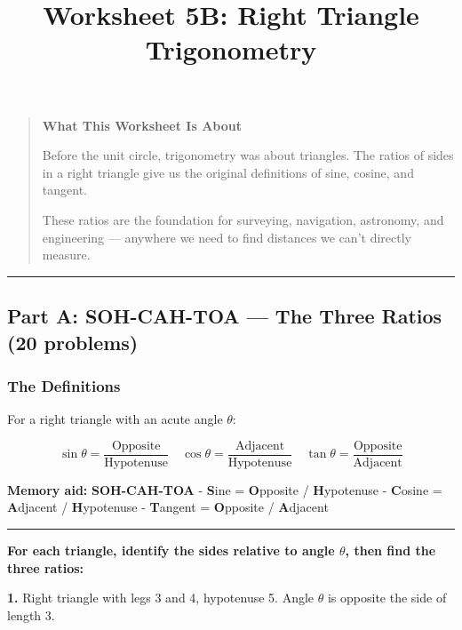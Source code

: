 \documentclass[
  11pt,
]{article}
\title{Worksheet 5B: Right Triangle Trigonometry}
\author{}
\date{}
\begin{document}
\maketitle

\begin{quote}
\textbf{What This Worksheet Is About}

Before the unit circle, trigonometry was about triangles. The ratios of
sides in a right triangle give us the original definitions of sine,
cosine, and tangent.

These ratios are the foundation for surveying, navigation, astronomy,
and engineering --- anywhere we need to find distances we can't directly
measure.
\end{quote}

\begin{center}\rule{0.5\linewidth}{0.5pt}\end{center}

\hypertarget{part-a-soh-cah-toa-the-three-ratios-20-problems}{%
\subsection{Part A: SOH-CAH-TOA --- The Three Ratios (20
problems)}\label{part-a-soh-cah-toa-the-three-ratios-20-problems}}

\hypertarget{the-definitions}{%
\subsubsection{The Definitions}\label{the-definitions}}

For a right triangle with an acute angle \(\theta\):

\[\sin\theta = \frac{\text{Opposite}}{\text{Hypotenuse}} \quad \cos\theta = \frac{\text{Adjacent}}{\text{Hypotenuse}} \quad \tan\theta = \frac{\text{Opposite}}{\text{Adjacent}}\]

\textbf{Memory aid:} \textbf{SOH-CAH-TOA} - \textbf{S}ine =
\textbf{O}pposite / \textbf{H}ypotenuse - \textbf{C}osine =
\textbf{A}djacent / \textbf{H}ypotenuse - \textbf{T}angent =
\textbf{O}pposite / \textbf{A}djacent

\begin{center}\rule{0.5\linewidth}{0.5pt}\end{center}

\textbf{For each triangle, identify the sides relative to angle
\(\theta\), then find the three ratios:}

\textbf{1.} Right triangle with legs 3 and 4, hypotenuse 5. Angle
\(\theta\) is opposite the side of length 3.
\end{document}

